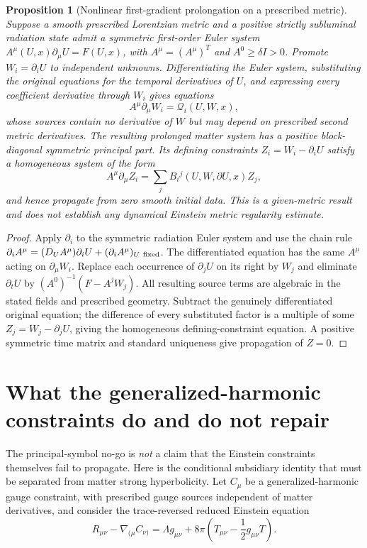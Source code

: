\documentclass[11pt,a4paper]{article}
\newtheorem{proposition}{Proposition}
\begin{document}
\begin{proposition}[Nonlinear first-gradient
prolongation on a prescribed metric]
\label{prop:nonlin-prolong}
Suppose a smooth prescribed
Lorentzian metric and a positive
strictly subluminal radiation
state admit a symmetric
first-order Euler system
$A^\mu(U,x)\partial_\mu U
=F(U,x)$, with
$A^\mu=(A^\mu)^T$ and
$A^0\ge\delta I>0$.
Promote $W_i=\partial_iU$
to independent unknowns.
Differentiating the Euler
system, substituting the
original equations for the
temporal derivatives of $U$,
and expressing every coefficient
derivative through $W_i$
gives equations
\[
A^\mu\partial_\mu W_i
=\mathcal Q_i(U,W,x),
\]
whose sources contain no
derivative of $W$ but may
depend on prescribed second
metric derivatives.
The resulting prolonged
matter system has a positive
block-diagonal symmetric
principal part. Its defining
constraints $Z_i=W_i-\partial_iU$
satisfy a homogeneous system
of the form
\[
A^\mu\partial_\mu Z_i
=\sum_j B_i{}^j(U,W,\partial U,x)Z_j,
\]
and hence propagate from
zero smooth initial data.
This is a given-metric
result and does not establish
any dynamical Einstein
metric regularity estimate.
\end{proposition}
\begin{proof}
Apply $\partial_i$ to the
symmetric radiation Euler
system and use the chain rule
$\partial_iA^\mu=
(D_UA^\mu)\partial_iU+
(\partial_iA^\mu)_{U\ {\rm fixed}}$.
The differentiated equation
has the same $A^\mu$ acting
on $\partial_\mu W_i$.
Replace each occurrence
of $\partial_jU$ on its right
by $W_j$ and eliminate
$\partial_tU$ by
$(A^0)^{-1}(F-A^jW_j)$.
All resulting source terms
are algebraic in the stated
fields and prescribed geometry.
Subtract the genuinely
differentiated original equation;
the difference of every
substituted factor is
a multiple of some
$Z_j=W_j-\partial_jU$,
giving the homogeneous
defining-constraint equation.
A positive symmetric time
matrix and standard uniqueness
give propagation of $Z=0$.
\end{proof}

\section{What the generalized-harmonic constraints do and do not repair}
The principal-symbol no-go is \emph{not} a claim that
the Einstein constraints themselves fail to propagate.
Here is the conditional subsidiary identity that
must be separated from matter strong hyperbolicity.
Let $C_\mu$ be a generalized-harmonic gauge constraint,
with prescribed gauge sources independent of matter
derivatives, and consider the trace-reversed
reduced Einstein equation
\begin{equation}\label{eq:reduced}
R_{\mu\nu}-\nabla_{(\mu}C_{\nu)}
=\Lambda g_{\mu\nu}
+8\pi\left(T_{\mu\nu}-\frac12g_{\mu\nu}T\right).
\end{equation}
\end{document}
